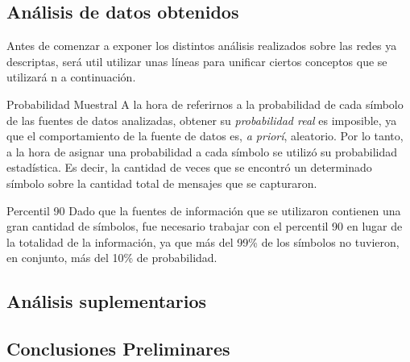     \subsection{An\'alisis de datos obtenidos}
    \par Antes de comenzar a exponer los distintos an\'alisis realizados sobre las redes
    ya descriptas, ser\'a util utilizar unas l\'ineas para unificar ciertos conceptos que
    se utilizar\'a n a continuaci\'on.

    \begin{LaTeXdescription}
        \item[Probabilidad Muestral] A la hora de referirnos a la probabilidad de cada
        s\'imbolo de las fuentes de datos analizadas, obtener su \textit{probabilidad
        real} es imposible, ya que el comportamiento de la fuente de datos es, \textit{%
        a prior\'i}, aleatorio. Por lo tanto, a la hora de asignar una probabilidad a cada
        s\'imbolo se utiliz\'o su probabilidad estad\'istica. Es decir, la cantidad de
        veces que se encontr\'o un determinado s\'imbolo sobre la cantidad total de mensajes
        que se capturaron.\\

        \item[Percentil 90] Dado que la fuentes de informaci\'on que se utilizaron contienen
        una gran cantidad de s\'imbolos, fue necesario trabajar con el percentil 90 en lugar
        de la totalidad de la informaci\'on, ya que m\'as del 99\% de los s\'imbolos no
        tuvieron, en conjunto, m\'as del 10\% de probabilidad.\\

    \end{LaTeXdescription}


    

    

    

    


    \subsection{An\'alisis suplementarios}\label{sec:escenario1_supl}

    \subsection{Conclusiones Preliminares}
